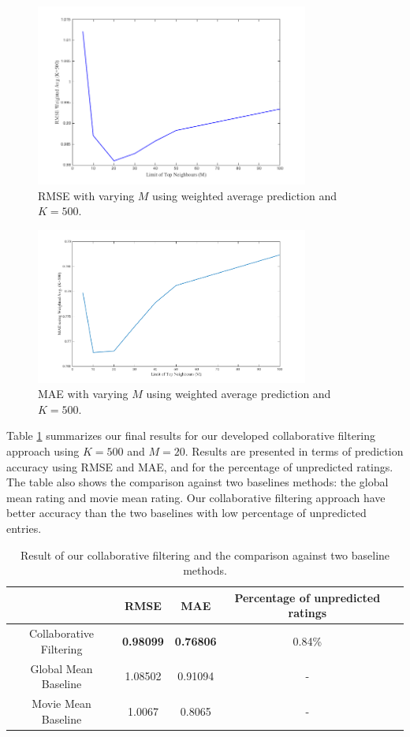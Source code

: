 \begin{figure}[!ht]
  \centering \includegraphics[width=0.8\textwidth]{images/rmsem.png}
  \caption{RMSE with varying $M$ using weighted average prediction and $K=500$.}
  \label{fig:rmsem}
\end{figure}

\begin{figure}[!ht]
  \centering \includegraphics[width=0.8\textwidth]{images/MAEm.png}
  \caption{MAE with varying $M$ using weighted average prediction and $K=500$.}
  \label{fig:maem}
\end{figure}

Table \ref{tab:finres} summarizes our final results for our developed
collaborative filtering approach using $K=500$ and $M=20$. Results are
presented in terms of prediction accuracy using RMSE and MAE, and for
the percentage of unpredicted ratings. The table also shows the
comparison against two baselines methods: the global mean rating and
movie mean rating. Our collaborative filtering approach have better
accuracy than the two baselines with low percentage of unpredicted
entries.

\begin{table}[!ht]
  \centering
  \begin{tabular}{|c|c|c|c|c|}
    \hline & RMSE & MAE & Percentage of unpredicted ratings \\ \hline
    Collaborative Filtering & \textbf{0.98099} & \textbf{0.76806} &
    0.84\%\\ \hline Global Mean Baseline & 1.08502 & 0.91094 & -
    \\ \hline Movie Mean Baseline & 1.0067 & 0.8065 & - \\ \hline
  \end{tabular}
  \caption{Result of our collaborative filtering and the comparison
    against two baseline methods.}
  \label{tab:finres}
\end{table}
